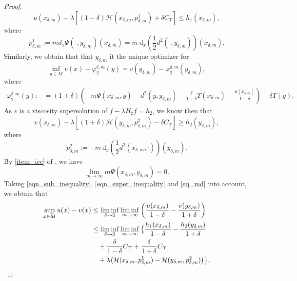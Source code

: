 \documentclass[a4paper]{article}
\numberwithin{equation}{section}
\theoremstyle{definition}
\begin{document}
\begin{proof}
\begin{equation}
u(x_{\delta,m})-\lambda\left[(1-\delta)\mathcal{H}(x_{\delta,m},p^1_{\delta,m})+\delta C_{\Upsilon}\right]\leq h_1(x_{\delta,m}),
\end{equation}
where
\begin{equation}\label{eqn_P1} p^1_{\delta,m}:=md_x\Psi(\cdot,y_{\delta,m})(x_{\delta,m})=m~ \mathrm{d}_{x}\left(\frac{1}{2} d^2(\cdot,y_{\delta,m})\right)(x_{\delta,m}).
\end{equation}
Similarly, we obtain that that $y_{\delta,m}$ it the unique optimizer for
\begin{equation*}
\inf_{y\in M}v(x)-\varphi_2^{\delta,m}(y)=v(y_{\delta,m})-\varphi_2^{\delta,m}(y_{\delta,m}),
\end{equation*}
where
\begin{align*}
\varphi^{\delta,m}_2(y):&=(1+\delta)\left(-m\Psi(x_{\delta,m},y)-d^2(y,y_{\delta,m})-\frac{\delta}{1-\delta}\Upsilon(x_{\delta,m})+\frac{u(x_{\delta,m})}{1-\delta}\right)-\delta\Upsilon(y).
\end{align*}
As $v$ is a viscosity supersolution of $f-\lambda H_{\ddagger}f=h_2$, we know then that
\begin{equation}\label{eqn_super_inequality}
v(x_{\delta,m})-\lambda\left[(1+\delta)\mathcal{H}(y_{\delta,m},p^2 _{\delta,m})-\delta C_{\Upsilon}\right]\geq h_2(y_{\delta,m}),
\end{equation}
where
\begin{equation}\label{eqn_P2}
p^2_{\delta,m}:=-m~\mathrm{d}_y \left(\frac{1}{2}d^2(x_{\delta,m},\cdot)\right)(y_{\delta,m}).
\end{equation}
By \cref{item_icc} of , we have
\begin{equation}\label{eq_md}
\lim_{m\to\infty}m\Psi(x_{\delta,m},y_{\delta,m})=0.
\end{equation}
Taking \eqref{eqn_sub_inequality}, \eqref{eqn_super_inequality} and \eqref{eq_md} into account, we obtain that
\begin{align}
\sup_{x\in M}u(x)-v(x)&\leq \liminf_{\delta\to0}\liminf_{m\to\infty}\left(\frac{u(x_{\delta,m})}{1-\delta}-\frac{v(y_{\delta,m})}{1+\delta}\right)\notag\\
&\leq \liminf_{\delta\to0}\liminf_{m\to\infty}\big\{\frac{h_1(x_{\delta,m})}{1-\delta}-\frac{h_2(y_{\delta,m})}{1+\delta}\label{eqn_k1}\\
&\quad+\frac{\delta}{1-\delta}C_{\Upsilon}+\frac{\delta}{1+\delta}C_{\Upsilon}\label{eqn_k2}\\
&\quad+ \lambda\big(\mathcal{H}(x_{\delta,m},p^1_{\delta,m})-\mathcal{H}(y_{\delta,m},p^2_{\delta,m})\big)\big\},

\end{align}
\end{proof}
\end{document}
